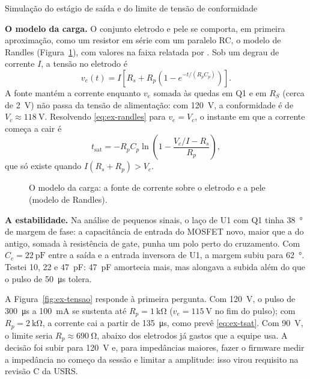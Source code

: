 \begin{atividade}{Simulação do estágio de saída e do limite de tensão de conformidade}
\begin{desenvolvimento}
\textbf{O modelo da carga.} O conjunto eletrodo e pele se comporta, em primeira aproximação, como
um resistor em série com um paralelo RC, o modelo de Randles (Figura~\ref{fig:ex-randles}), com
valores na faixa relatada por \textcite{merrill2005}. Sob um degrau de corrente $I$, a tensão no
eletrodo é
\begin{equation}
  v_e(t) = I \left[ R_s + R_p \left( 1 - e^{-t/(R_p C_p)} \right) \right].
  \label{eq:ex-randles}
\end{equation}
A fonte mantém a corrente enquanto $v_e$ somada às quedas em Q1 e em $R_S$ (cerca de
\SI{2}{\volt}) não passa da tensão de alimentação: com \SI{120}{\volt}, a conformidade é de
$V_c \approx \SI{118}{\volt}$. Resolvendo \eqref{eq:ex-randles} para $v_e = V_c$, o instante em que a
corrente começa a cair é
\begin{equation}
  t_\mathrm{sat} = -R_p C_p \ln\!\left( 1 - \frac{V_c/I - R_s}{R_p} \right),
  \label{eq:ex-tsat}
\end{equation}
que só existe quando $I (R_s + R_p) > V_c$.

\begin{figure}[htbp]
  \centering
  
  \caption{O modelo da carga: a fonte de corrente sobre o eletrodo e a pele (modelo de Randles).}
  \label{fig:ex-randles}
\end{figure}

\textbf{A estabilidade.} Na análise de pequenos sinais, o laço de U1 com Q1 tinha
\SI{38}{\degree} de margem de fase: a capacitância de entrada do MOSFET novo, maior que a do antigo,
somada à resistência de gate, punha um polo perto do cruzamento. Com $C_c = \SI{22}{\pico\farad}$
entre a saída e a entrada inversora de U1, a margem subiu para \SI{62}{\degree}. Testei 10, 22 e
\SI{47}{\pico\farad}: \SI{47}{\pico\farad} amortecia mais, mas alongava a subida além do que o pulso
de \SI{50}{\micro\second} tolera.
\end{desenvolvimento}

\begin{resultados}
A Figura~\ref{fig:ex-tensao} responde à primeira pergunta. Com \SI{120}{\volt}, o pulso de
\SI{300}{\micro\second} a \SI{100}{\milli\ampere} se sustenta até $R_p = \SI{1}{\kilo\ohm}$
($v_e = \SI{115}{\volt}$ no fim do pulso); com $R_p = \SI{2}{\kilo\ohm}$, a corrente cai a partir de
\SI{135}{\micro\second}, como prevê \eqref{eq:ex-tsat}. Com \SI{90}{\volt}, o limite seria
$R_p \approx \SI{690}{\ohm}$, abaixo dos eletrodos já gastos que a equipe usa. A decisão foi subir
para \SI{120}{\volt} e, para impedâncias maiores, fazer o firmware medir a impedância no começo da
sessão e limitar a amplitude: isso virou requisito na revisão C da USRS.


\end{resultados}
\end{atividade}
